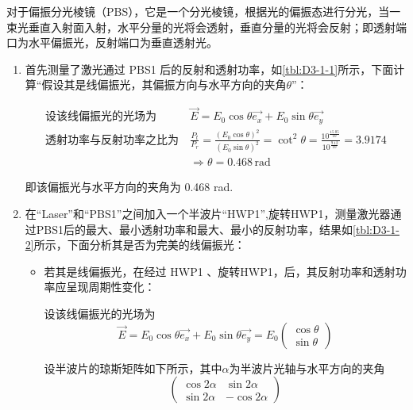 \documentclass[dvipsnames, svgnames,a4paper,11pt]{article}
\begin{document}
		对于偏振分光棱镜（PBS），它是一个分光棱镜，根据光的偏振态进行分光，当一束光垂直入射面入射，水平分量的光将会透射，垂直分量的光将会反射；即透射端口为水平偏振光，反射端口为垂直透射光。
		
		\begin{enumerate}
			\item 首先测量了激光通过 PBS1 后的反射和透射功率，如\cref{tbl:D3-1-1}所示，下面计算“假设其是线偏振光，其偏振方向与水平方向的夹角$\theta$”：

				\begin{align}
					\text{设该线偏振光的光场为} \ & \vec{E} = E_0 \cos\theta \vec{e_x} + E_0 \sin\theta \vec{e_y} \nonumber \\
					\text{透射功率与反射功率之比为} \ & \frac{P_t}{P_r} = \frac{(E_0 \cos\theta)^2}{(E_0 \sin\theta)^2} = \cot^2\theta = \frac{10^{\frac{15.05}{10}}}{10^{\frac{9.12}{10}}} = 3.9174 \nonumber \\
					& \Rightarrow \theta = 0.468 \, \mathrm{rad} \nonumber
				\end{align}

			即该偏振光与水平方向的夹角为 0.468 rad.

			\item 在“Laser”和“PBS1”之间加入一个半波片“HWP1”,旋转HWP1，测量激光器通过PBS1后的最大、最小透射功率和最大、最小的反射功率，结果如\cref{tbl:D3-1-2}所示，下面分析其是否为完美的线偏振光：
				\begin{itemize}
					\item 若其是线偏振光，在经过 HWP1 、旋转HWP1，后，其反射功率和透射功率应呈现周期性变化：
					
					设该线偏振光的光场为 
					$$ \vec{E} = E_0 \cos\theta \vec{e_x} + E_0 \sin\theta \vec{e_y} = E_0
					\begin{pmatrix}
						\cos\theta	\\
						\sin\theta
					\end{pmatrix} 
					$$

					设半波片的琼斯矩阵如下所示，其中$\alpha$为半波片光轴与水平方向的夹角 
					$$ \begin{pmatrix}
					 		\cos2\alpha		&\sin2\alpha	\\
							\sin2\alpha		&-\cos2\alpha
					 	\end{pmatrix} 
					$$


\end{itemize}
\end{enumerate}
\end{document}
